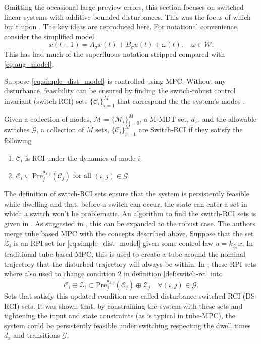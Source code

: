 Omitting the occasional large preview errors, this section focuses on switched linear systems with additive bounded disturbances. This was the focus of \cite{Lavaei2021} which built upon \cite{Danielson2019}. The key ideas are reproduced here. For notational convenience, consider the simplified model
\begin{equation}\label{eq:simple_dist_model}
    x(t+1)=A_\sigma x(t)+B_\sigma u(t) + \omega(t),\quad \omega\in\mathcal{W}.
\end{equation}
This has had much of the superfluous notation stripped compared with  \eqref{eq:aug_model}.

Suppose \eqref{eq:simple_dist_model} is controlled using MPC. Without any disturbance, feasibility can be ensured by finding the switch-robust control invariant (switch-RCI) sets $\{\mathcal{C}_i\}_{i=1}^M$ that correspond the the system's modes \cite{Danielson2019}. 
\begin{definition}\label{def:switch-rci}
    Given a collection of modes, $\mathcal{M}=\{\mathcal{M}_i\}_{i=0}^M$, a M-MDT set, $d_x$, and the allowable switches $\mathcal{G}$, a collection of $M$ sets, $\{\mathcal{C}_i\}^M_{i=1}$ are Switch-RCI if they satisfy the following
    \begin{enumerate}
        \item $\mathcal{C}_i$ is RCI under the dynamics of mode $i$.
        \item $\mathcal{C}_{i}\subseteq \text{Pre}^{d_{x,j}}_j(\mathcal{C}_j)$ for all $(i,j)\in\mathcal{G}$.
    \end{enumerate}
\end{definition}
The definition of switch-RCI sets ensure that the system is persistently feasible while dwelling and that, before a switch can occur, the state can enter a set in which a switch won't be problematic. An algorithm to find the switch-RCI sets is given in \cite{Danielson2019}. As suggested in \cite{Lavaei2021}, this can be expanded to the robust case. The authors merge tube based MPC \cite{Mayne2005} with the concepts described above. Suppose that the set $\mathcal{Z}_i$ is an RPI set for \eqref{eq:simple_dist_model} given some control law $u=k_{\mathcal{Z}_i}x$. In traditional tube-based MPC, this is used to create a tube around the nominal trajectory that the disturbed trajectory will always be within. In \cite{Lavaei2021}, these RPI sets where also used to change condition 2 in definition \ref{def:switch-rci} into
$$\mathcal{C}_i\oplus \mathcal{Z}_i\subset \text{Pre}^{d_{x,j}}_j(\mathcal{C}_j)\oplus \mathcal{Z}_j\quad \forall (i,j)\in\mathcal{G}.$$
Sets that satisfy this updated condition are called disturbance-switched-RCI (DS-RCI) sets. It was shown that, by constraining the system with these sets and tightening the input and state constraints (as is typical in tube-MPC), the system could be persistently feasible under switching respecting the dwell times $d_x$ and transitions $\mathcal{G}$.